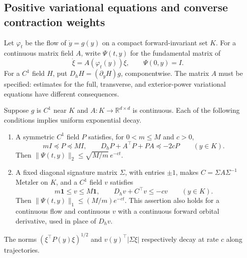\subsection{Positive variational equations and converse contraction weights}
\label{s:PositiveWeights}
Let $\varphi_t$ be the flow of $\dot y=g(y)$ on a compact forward-invariant
set $K$. For a continuous matrix field $A$, write $\Psi(t,y)$ for the
fundamental matrix of
\[
 \dot\xi=A(\varphi_t(y))\xi,\qquad \Psi(0,y)=I.
\]
For a $C^1$ field $H$, put $D_hH=(\partial_yH)g$, componentwise.
The matrix $A$ must be specified: estimates for the full, transverse,
and exterior-power variational equations have different consequences.

Suppose $g$ is $C^1$ near $K$ and $A:K\to\mathbb R^{d\times d}$ is
continuous. Each of the following conditions implies uniform exponential decay.
\begin{enumerate}
\item A symmetric $C^1$ field $P$ satisfies, for $0<m\le M$ and $c>0$,
\begin{equation}\label{HG:transportLMI}
 mI\preceq P\preceq MI,\qquad
 D_hP+A^\top P+PA\preceq-2cP\qquad(y\in K).
\end{equation}
Then $\|\Psi(t,y)\|_2\le\sqrt{M/m}\,e^{-ct}$.
\item A fixed diagonal signature matrix $\Sigma$, with entries $\pm1$,
makes $C=\Sigma A\Sigma^{-1}$ Metzler on $K$, and a $C^1$ field $v$ satisfies
\begin{equation}\label{HG:transportLP}
 m\mathbf1\le v\le M\mathbf1,\qquad
 D_hv+C^\top v\le-cv\qquad(y\in K).
\end{equation}
Then $\|\Psi(t,y)\|_1\le(M/m)e^{-ct}$.
This assertion also holds for a continuous flow and continuous $v$
with a continuous forward orbital derivative, used in place of $D_hv$.
\end{enumerate}
The norms $(\xi^\top P(y)\xi)^{1/2}$ and $v(y)^\top|\Sigma\xi|$
respectively decay at rate $c$ along trajectories.

